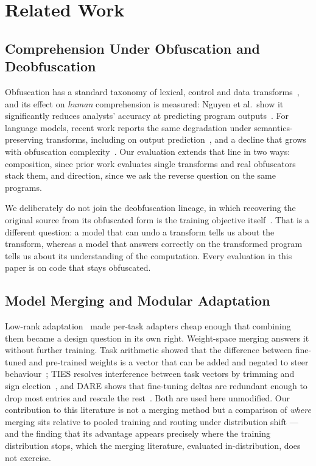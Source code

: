 \section{Related Work}
\label{sec:related}

\subsection{Comprehension Under Obfuscation and Deobfuscation}
Obfuscation has a standard taxonomy of lexical, control and data
transforms~\cite{collberg1997taxonomy,collberg2002manufacturing}, and its effect on \emph{human}
comprehension is measured: Nguyen et al.\ show it significantly reduces analysts' accuracy at
predicting program outputs~\cite{nguyen2026effectcodeobfuscationhuman}. For language models, recent
work reports the same degradation under semantics-preserving transforms, including on output
prediction~\cite{ase26}, and a decline that grows with obfuscation
complexity~\cite{nikiema2025codebarrierllmsactually}. Our evaluation extends that line in two ways:
composition, since prior work evaluates single transforms and real obfuscators stack them, and
direction, since we ask the reverse question on the same programs.

We deliberately do not join the deobfuscation lineage, in which recovering the original source from
its obfuscated form is the training objective itself~\cite{dobf}. That is a different question: a model that can undo a transform
tells us about the transform, whereas a model that answers correctly on the transformed program tells
us about its understanding of the computation. Every evaluation in this paper is on code that stays
obfuscated.

\subsection{Model Merging and Modular Adaptation}
Low-rank adaptation~\cite{lora} made per-task adapters cheap enough that combining them became a
design question in its own right. Weight-space merging answers it without further training. Task arithmetic showed that the difference
between fine-tuned and pre-trained weights is a vector that can be added and negated to steer
behaviour~\cite{taskarithmetic}; TIES
resolves interference between task vectors by trimming and sign election~\cite{ties}, and DARE shows
that fine-tuning deltas are redundant enough to drop most entries and rescale the
rest~\cite{dare}. Both are used here unmodified. Our contribution to this literature is not a
merging method but a comparison of \emph{where} merging sits relative to pooled training and routing
under distribution shift --- and the finding that its advantage appears precisely where the training
distribution stops, which the merging literature, evaluated in-distribution, does not exercise.


